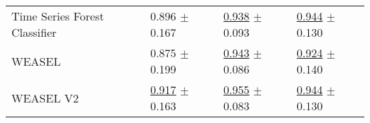 \begin{tabular}{llll}
Time Series Forest Classifier & \textcolor[rgb]{0.0920502092,0.5000000000,0}{0.896} $\pm$ \textcolor[rgb]{0.5790995120,0.4209004880,0}{0.167} & \underline{\textcolor[rgb]{0.1990521327,0.5000000000,0}{0.938}} $\pm$ \textcolor[rgb]{0.2953042690,0.5000000000,0}{0.093} & \underline{\textcolor[rgb]{0.1111111111,0.5000000000,0}{0.944}} $\pm$ \textcolor[rgb]{0.3121982484,0.5000000000,0}{0.130} \\
WEASEL & \textcolor[rgb]{0.1380753138,0.5000000000,0}{0.875} $\pm$ \textcolor[rgb]{0.7390823473,0.2609176527,0}{0.199} & \underline{\textcolor[rgb]{0.1706161137,0.5000000000,0}{0.943}} $\pm$ \textcolor[rgb]{0.2209016468,0.5000000000,0}{0.086} & \underline{\textcolor[rgb]{0.1944444444,0.5000000000,0}{0.924}} $\pm$ \textcolor[rgb]{0.4049258024,0.5000000000,0}{0.140} \\
WEASEL V2 & \underline{\textcolor[rgb]{0.0460251046,0.5000000000,0}{0.917}} $\pm$ \textcolor[rgb]{0.5577723962,0.4422276038,0}{0.163} & \underline{\textcolor[rgb]{0.0995260664,0.5000000000,0}{0.955}} $\pm$ \textcolor[rgb]{0.1853514393,0.5000000000,0}{0.083} & \underline{\textcolor[rgb]{0.1111111111,0.5000000000,0}{0.944}} $\pm$ \textcolor[rgb]{0.3121982484,0.5000000000,0}{0.130} \\
\bottomrule
\end{tabular}

